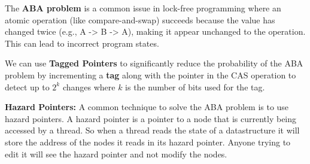 \begin{important}
    The \textbf{ABA problem} is a common issue in lock-free programming where an atomic operation (like compare-and-swap) succeeds because the value has changed twice (e.g., A -> B -> A), making it appear unchanged to the operation. This can lead to incorrect program states.
\end{important}


\begin{definition}
    We can use \textbf{Tagged Pointers} to significantly reduce the probability of the ABA problem by incrementing a \textbf{tag} along with the pointer in the CAS operation to detect up to $2^k$ changes where $k$ is the number of bits used for the tag.
\end{definition}

\begin{definition}
    \textbf{Hazard Pointers:} A common technique to solve the ABA problem is to use hazard pointers. A hazard pointer is a pointer to a node that is currently being accessed by a thread. So when a thread reads the state of a datastructure it will store the address of the nodes it reads in its hazard pointer. Anyone trying to edit it will see the hazard pointer and not modify the nodes.
\end{definition}